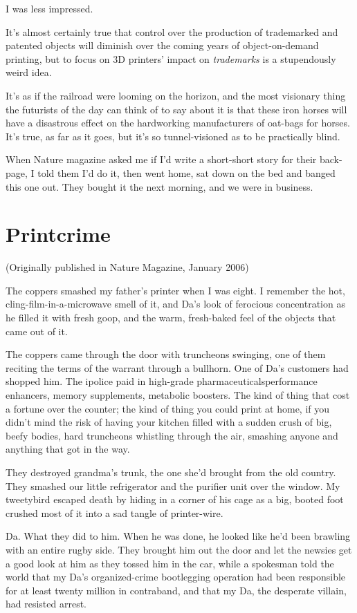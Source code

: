 I was less impressed.

It’s almost certainly true that control over the production of
trademarked and patented objects will diminish over the coming
years of object-on-demand printing, but to focus on 3D printers’
impact on \emph{trademarks} is a stupendously weird idea.

It’s as if the railroad were looming on the horizon, and the most
visionary thing the futurists of the day can think of to say about
it is that these iron horses will have a disastrous effect on the
hardworking manufacturers of oat-bags for horses. It’s true, as far
as it goes, but it’s so tunnel-visioned as to be practically
blind.

When Nature magazine asked me if I’d write a short-short story for
their back-page, I told them I’d do it, then went home, sat down on
the bed and banged this one out. They bought it the next morning,
and we were in business.

\section{Printcrime}

\textsf{(Originally published in Nature Magazine, January 2006)}

The coppers smashed my father’s printer when I was eight. I
remember the hot, cling-film-in-a-microwave smell of it, and Da’s
look of ferocious concentration as he filled it with fresh goop,
and the warm, fresh-baked feel of the objects that came out of it.

The coppers came through the door with truncheons swinging, one of
them reciting the terms of the warrant through a bullhorn. One of
Da’s customers had shopped him. The ipolice paid in high-grade
pharmaceuticals\dash{}performance enhancers, memory supplements,
metabolic boosters. The kind of thing that cost a fortune over the
counter; the kind of thing you could print at home, if you didn’t
mind the risk of having your kitchen filled with a sudden crush of
big, beefy bodies, hard truncheons whistling through the air,
smashing anyone and anything that got in the way.

They destroyed grandma’s trunk, the one she’d brought from the old
country. They smashed our little refrigerator and the purifier unit
over the window. My tweetybird escaped death by hiding in a corner
of his cage as a big, booted foot crushed most of it into a sad
tangle of printer-wire.

Da. What they did to him. When he was done, he looked like he’d
been brawling with an entire rugby side. They brought him out the
door and let the newsies get a good look at him as they tossed him
in the car, while a spokesman told the world that my Da’s
organized-crime bootlegging operation had been responsible for at
least twenty million in contraband, and that my Da, the desperate
villain, had resisted arrest.

